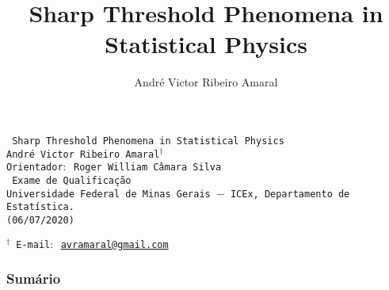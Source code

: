 \documentclass[9pt]{beamer}
\title{Sharp Threshold Phenomena in Statistical Physics}
\author[André V. R. Amaral]{André Victor Ribeiro Amaral}
\theoremstyle{definition} %
\begin{document}
	\AtBeginSection{} %
	
	\begin{frame}[t]
		\centering
		\vspace{40pt}
		\texttt{{\Large {} Sharp Threshold Phenomena in Statistical Physics}} \\
		\vspace{30pt}
		\texttt{{\normalsize André Victor Ribeiro Amaral${}^{\dagger}$}} \\
		\texttt{{\small Orientador$:$ Roger William Câmara Silva}}\\
		\vspace{30pt}
		\texttt{{\normalsize {} Exame de Qualificação}} \\
		\vspace{30pt}
		\texttt{{\small Universidade Federal de Minas Gerais $-$ ICEx, Departamento de Estatística.}}\\
		\texttt{{\small (06/07/2020)}} \\
		\vspace{26pt}
		\begin{flushleft} \texttt{{\scriptsize ${}^{\dagger}$~E-mail$:$ \href{mailto:avramaral@gmail.com}{avramaral@gmail.com}}} \end{flushleft}
		
	\end{frame}

	\begin{frame}[t]
		\frametitle{Sumário}
		\tableofcontents
	\end{frame}
\end{document}
